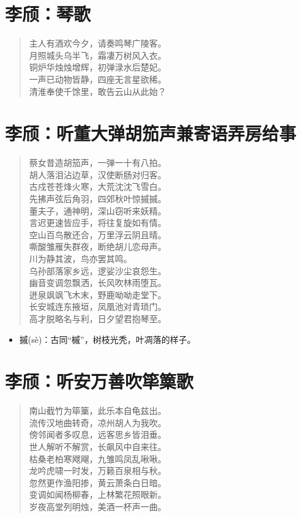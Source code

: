 \documentclass[12pt,oneside]{book}
\newenvironment{shici}{
\begin{verse}
\centering\large\hspace{12pt}}
{\end{verse}}
\begin{document}
\chapter{李颀：琴歌}
\begin{shici}
主人有酒欢今夕，请奏鸣琴广陵客。\\
月照城头乌半飞，霜凄万树风入衣。\\
铜炉华烛烛增辉，初弹渌水后楚妃。\\
一声已动物皆静，四座无言星欲稀。\\
清淮奉使千馀里，敢告云山从此始？
\end{shici}

\chapter{李颀：听董大弹胡笳声兼寄语弄房给事}
\begin{shici}
蔡女昔造胡笳声，一弹一十有八拍。\\
胡人落泪沾边草，汉使断肠对归客。\\
古戍苍苍烽火寒，大荒沈沈飞雪白。\\
先拂声弦后角羽，四郊秋叶惊摵摵。\\
董夫子，通神明，深山窃听来妖精。\\
言迟更速皆应手，将往复旋如有情。\\
空山百鸟散还合，万里浮云阴且晴。\\
嘶酸雏雁失群夜，断绝胡儿恋母声。\\
川为静其波，鸟亦罢其鸣。\\
乌孙部落家乡远，逻娑沙尘哀怨生。\\
幽音变调忽飘洒，长风吹林雨堕瓦。\\
迸泉飒飒飞木末，野鹿呦呦走堂下。\\
长安城连东掖垣，凤凰池对青琐门。\\
高才脱略名与利，日夕望君抱琴至。
\end{shici}

\begin{itemize}
\item 摵(sè)：古同“槭”，树枝光秃，叶凋落的样子。
\end{itemize}

\chapter{李颀：听安万善吹筚篥歌}
\begin{shici}
南山截竹为筚篥，此乐本自龟兹出。\\
流传汉地曲转奇，凉州胡人为我吹。\\
傍邻闻者多叹息，远客思乡皆泪垂。\\
世人解听不解赏，长飙风中自来往。\\
枯桑老柏寒飕飗，九雏鸣凤乱啾啾。\\
龙吟虎啸一时发，万籁百泉相与秋。\\
忽然更作渔阳掺，黄云萧条白日暗。\\
变调如闻杨柳春，上林繁花照眼新。\\
岁夜高堂列明烛，美酒一杯声一曲。
\end{shici}
\end{document}
